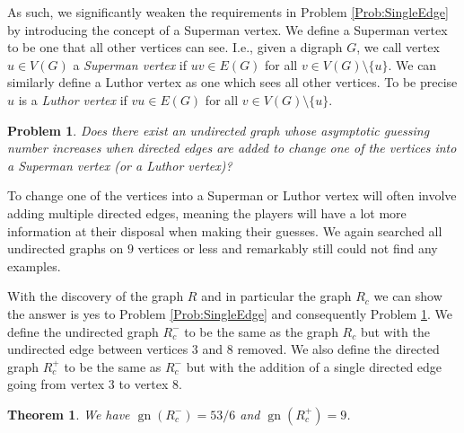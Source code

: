 \documentclass[a4paper, 14pt]{extarticle}
\theoremstyle{plain}
\newtheorem{theorem}[proposition]{Theorem}
\newtheorem{problem}[proposition]{Problem}
\DeclareMathOperator{\gn}{gn}
\begin{document}
As such, we significantly weaken the requirements in Problem
\ref{Prob:SingleEdge} by introducing the concept of a Superman
vertex. We define a Superman vertex to be one that all other
vertices can see. I.e., given a digraph $G$, we call vertex $u\in V(G)$ a
\emph{Superman vertex} if $uv\in E(G)$ for all $v\in V(G)\setminus \{u\}$. We
can similarly define a Luthor vertex as one which sees all
other vertices. To be precise $u$ is a \emph{Luthor vertex} if $vu\in E(G)$
for all $v\in V(G)\setminus \{u\}$.

\begin{problem}\label{Prob:Superman}
Does there exist an undirected graph whose asymptotic guessing
number increases when directed edges are added to change one of the
vertices into a Superman vertex (or a Luthor vertex)?
\end{problem}

To change one of the vertices into a Superman or Luthor vertex will
often involve adding multiple directed edges, meaning the players
will have a lot more information at their disposal when making their
guesses. We again searched all undirected graphs on $9$ vertices or
less and remarkably still could not find any examples.

With the discovery of the graph $R$ and in particular the graph
$R_c$ we can show the answer is yes to Problem \ref{Prob:SingleEdge}
and consequently Problem \ref{Prob:Superman}. We define the
undirected graph $R_c^-$ to be the same as the graph $R_c$ but with
the undirected edge between vertices $3$ and $8$ removed. We also
define the directed graph $R_c^+$ to be the same as $R_c^-$ but with
the addition of a single directed edge going from vertex $3$ to vertex $8$.

\begin{theorem}
We have $\gn(R_c^-) = 53/6$ and $\gn(R_c^+) = 9$.
\end{theorem}
\end{document}
